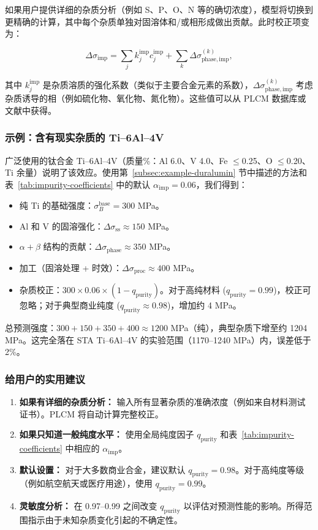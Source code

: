 \documentclass[12pt,a4paper]{article}
\begin{document}
	如果用户提供详细的杂质分析（例如 S、P、O、N 等的确切浓度），模型将切换到更精确的计算，其中每个杂质单独对固溶体和/或相形成做出贡献。此时校正项变为：
	
	\[
	\Delta\sigma_{\mathrm{imp}} = \sum_{j} k_j^{\mathrm{imp}} c_j^{\mathrm{imp}} + \sum_{k} \Delta\sigma_{\mathrm{phase,imp}}^{(k)},
	\]
	
	其中 \(k_j^{\mathrm{imp}}\) 是杂质溶质的强化系数（类似于主要合金元素的系数），\(\Delta\sigma_{\mathrm{phase,imp}}^{(k)}\) 考虑杂质诱导的相（例如硫化物、氧化物、氮化物）。这些值可以从 PLCM 数据库或文献中获得。
	
	\subsubsection*{示例：含有现实杂质的 Ti--6Al--4V}
	
	广泛使用的钛合金 Ti–6Al–4V（质量\%：Al 6.0、V 4.0、Fe \(\le\)0.25、O \(\le\)0.20、Ti 余量）说明了该效应。使用第~\ref{subsec:example-duralumin} 节中描述的方法和表~\ref{tab:impurity-coefficients} 中的默认 \(\alpha_{\mathrm{imp}}=0.06\)，我们得到：
	
	\begin{itemize}
		\item 纯 Ti 的基础强度：\(\sigma_B^{\mathrm{base}} = 300\) MPa。
		\item Al 和 V 的固溶强化：\(\Delta\sigma_{\mathrm{ss}} \approx 150\) MPa。
		\item \(\alpha+\beta\) 结构的贡献：\(\Delta\sigma_{\mathrm{phase}} \approx 350\) MPa。
		\item 加工（固溶处理 + 时效）：\(\Delta\sigma_{\mathrm{proc}} \approx 400\) MPa。
		\item 杂质校正：\(300 \times 0.06 \times (1 - q_{\mathrm{purity}})\)。对于高纯材料 (\(q_{\mathrm{purity}}=0.99\))，校正可忽略；对于典型商业纯度 (\(q_{\mathrm{purity}}\approx 0.98\))，增加约 4 MPa。
	\end{itemize}
	
	总预测强度：\(300+150+350+400 \approx 1200\) MPa（纯），典型杂质下增至约 1204 MPa。这完全落在 STA Ti–6Al–4V 的实验范围（1170–1240 MPa）内，误差低于 2\%。
	
	\subsubsection*{给用户的实用建议}
	
	\begin{enumerate}
		\item \textbf{如果有详细的杂质分析：} 输入所有显著杂质的准确浓度（例如来自材料测试证书）。PLCM 将自动计算完整校正。
		\item \textbf{如果只知道一般纯度水平：} 使用全局纯度因子 \(q_{\mathrm{purity}}\) 和表~\ref{tab:impurity-coefficients} 中相应的 \(\alpha_{\mathrm{imp}}\)。
		\item \textbf{默认设置：} 对于大多数商业合金，建议默认 \(q_{\mathrm{purity}} = 0.98\)。对于高纯度等级（例如航空航天或医疗用途），使用 \(q_{\mathrm{purity}} = 0.99\)。
		\item \textbf{灵敏度分析：} 在 0.97–0.99 之间改变 \(q_{\mathrm{purity}}\) 以评估对预测性能的影响。所得范围指示由于未知杂质变化引起的不确定性。
	\end{enumerate}
	
\end{document}
